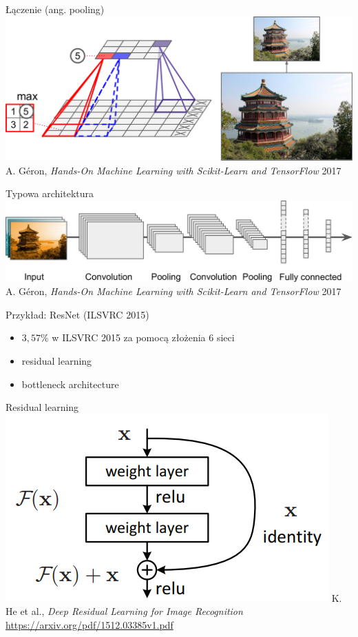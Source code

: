 \documentclass{sa}
\begin{document}
\begin{frame}{Łączenie (ang. pooling)}
\includegraphics[width=\textwidth]{mlst_1308.png}
{\vfill\footnotesize A. Géron, \emph{Hands-On Machine Learning with Scikit-Learn and TensorFlow} 2017}
\end{frame}

\begin{frame}{Typowa architektura}
\includegraphics[width=\textwidth]{mlst_1309.png}
{\vfill\footnotesize A. Géron, \emph{Hands-On Machine Learning with Scikit-Learn and TensorFlow} 2017}
\end{frame}

\begin{frame}{Przykład: ResNet (ILSVRC 2015)}
\begin{itemize}
\item $3{,}57\%$ w ILSVRC 2015 za pomocą złożenia 6 sieci
\item residual learning
\item bottleneck architecture
\end{itemize}
\end{frame}

\begin{frame}{Residual learning}
\includegraphics[width=\textwidth]{resnet_fig2.png}
{\vfill\footnotesize K. He et al., \emph{Deep Residual Learning for Image Recognition} \url{https://arxiv.org/pdf/1512.03385v1.pdf}}
\end{frame}
\end{document}
